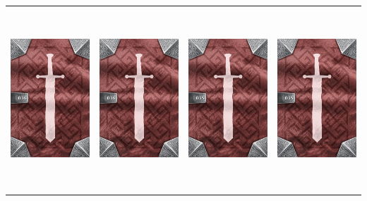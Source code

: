 \documentclass{minimal}
\begin{document}
{\begin{longtable}{llll}
\includegraphics[width=44mm,height=68mm]{./36-42/gh-036-boots-of-dashing-back.png} &
\includegraphics[width=44mm,height=68mm]{./36-42/gh-036-boots-of-dashing-back.png} &
\includegraphics[width=44mm,height=68mm]{./29-35/gh-035-falcon-figurine-back.png} &
\includegraphics[width=44mm,height=68mm]{./29-35/gh-035-falcon-figurine-back.png}\\ 

\end{longtable}}
\end{document}
